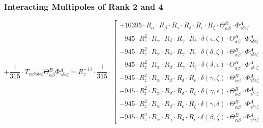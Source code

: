 \documentclass{article}
\begin{document}
\subsubsection{Interacting Multipoles of Rank 2 and 4}
\begin{equation}
+ \frac{1}{315} \cdot T_{\alpha{}\beta{}\gamma{}\delta{}\epsilon{}\zeta{}} \Theta{}^{B}_{\alpha{}\beta{}} \Phi{}^{A}_{\gamma{}\delta{}\epsilon{}\zeta{}} = R_{z}^{-13} \cdot \frac{1}{315} \cdot  \left[ \begin{array}{c} 
 		+ 10395 \cdot R_{\alpha{}} \cdot R_{\beta{}} \cdot R_{\gamma{}} \cdot R_{\delta{}} \cdot R_{\epsilon{}} \cdot R_{\zeta{}} \cdot \Theta{}^{B}_{\alpha{}\beta{}} \cdot \Phi{}^{A}_{\gamma{}\delta{}\epsilon{}\zeta{}} 
 \\[0.2em] 		 - 945 \cdot R_{z}^{2} \cdot R_{\alpha{}} \cdot R_{\beta{}} \cdot R_{\gamma{}} \cdot R_{\delta{}} \cdot \delta{}\left(\epsilon{}, \zeta{}\right) \cdot \Theta{}^{B}_{\alpha{}\beta{}} \cdot \Phi{}^{A}_{\gamma{}\delta{}\epsilon{}\zeta{}} 
 \\[0.2em] 		 - 945 \cdot R_{z}^{2} \cdot R_{\alpha{}} \cdot R_{\beta{}} \cdot R_{\gamma{}} \cdot R_{\epsilon{}} \cdot \delta{}\left(\delta{}, \zeta{}\right) \cdot \Theta{}^{B}_{\alpha{}\beta{}} \cdot \Phi{}^{A}_{\gamma{}\delta{}\epsilon{}\zeta{}} 
 \\[0.2em] 		 - 945 \cdot R_{z}^{2} \cdot R_{\alpha{}} \cdot R_{\beta{}} \cdot R_{\gamma{}} \cdot R_{\zeta{}} \cdot \delta{}\left(\delta{}, \epsilon{}\right) \cdot \Theta{}^{B}_{\alpha{}\beta{}} \cdot \Phi{}^{A}_{\gamma{}\delta{}\epsilon{}\zeta{}} 
 \\[0.2em] 		 - 945 \cdot R_{z}^{2} \cdot R_{\alpha{}} \cdot R_{\beta{}} \cdot R_{\delta{}} \cdot R_{\epsilon{}} \cdot \delta{}\left(\gamma{}, \zeta{}\right) \cdot \Theta{}^{B}_{\alpha{}\beta{}} \cdot \Phi{}^{A}_{\gamma{}\delta{}\epsilon{}\zeta{}} 
 \\[0.2em] 		 - 945 \cdot R_{z}^{2} \cdot R_{\alpha{}} \cdot R_{\beta{}} \cdot R_{\delta{}} \cdot R_{\zeta{}} \cdot \delta{}\left(\gamma{}, \epsilon{}\right) \cdot \Theta{}^{B}_{\alpha{}\beta{}} \cdot \Phi{}^{A}_{\gamma{}\delta{}\epsilon{}\zeta{}} 
 \\[0.2em] 		 - 945 \cdot R_{z}^{2} \cdot R_{\alpha{}} \cdot R_{\beta{}} \cdot R_{\epsilon{}} \cdot R_{\zeta{}} \cdot \delta{}\left(\gamma{}, \delta{}\right) \cdot \Theta{}^{B}_{\alpha{}\beta{}} \cdot \Phi{}^{A}_{\gamma{}\delta{}\epsilon{}\zeta{}} 
 \\[0.2em] 		 - 945 \cdot R_{z}^{2} \cdot R_{\alpha{}} \cdot R_{\gamma{}} \cdot R_{\delta{}} \cdot R_{\epsilon{}} \cdot \delta{}\left(\beta{}, \zeta{}\right) \cdot \Theta{}^{B}_{\alpha{}\beta{}} \cdot \Phi{}^{A}_{\gamma{}\delta{}\epsilon{}\zeta{}} 

\end{array}
\end{equation}
\end{document}
